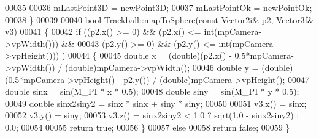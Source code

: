 \begin{DoxyCode}
00035 
00036   mLastPoint3D = newPoint3D;
00037   mLastPointOk = newPointOk;
00038 \}
00039 
00040 \textcolor{keywordtype}{bool} Trackball::mapToSphere(\textcolor{keyword}{const} Vector2i& p2, Vector3f& v3)
00041 \{
00042   \textcolor{keywordflow}{if} ((p2.x() >= 0) && (p2.x() <= int(mpCamera->vpWidth())) &&
00043       (p2.y() >= 0) && (p2.y() <= int(mpCamera->vpHeight())) )
00044   \{
00045     \textcolor{keywordtype}{double} x  = (double)(p2.x() - 0.5*mpCamera->vpWidth())  / (\textcolor{keywordtype}{double})mpCamera->vpWidth();
00046     \textcolor{keywordtype}{double} y  = (double)(0.5*mpCamera->vpHeight() - p2.y()) / (\textcolor{keywordtype}{double})mpCamera->vpHeight();
00047     \textcolor{keywordtype}{double} sinx         = sin(M\_PI * x * 0.5);
00048     \textcolor{keywordtype}{double} siny         = sin(M\_PI * y * 0.5);
00049     \textcolor{keywordtype}{double} sinx2siny2   = sinx * sinx + siny * siny;
00050 
00051     v3.x() = sinx;
00052     v3.y() = siny;
00053     v3.z() = sinx2siny2 < 1.0 ? sqrt(1.0 - sinx2siny2) : 0.0;
00054 
00055     \textcolor{keywordflow}{return} \textcolor{keyword}{true};
00056   \}
00057   \textcolor{keywordflow}{else}
00058     \textcolor{keywordflow}{return} \textcolor{keyword}{false};
00059 \}
\end{DoxyCode}
